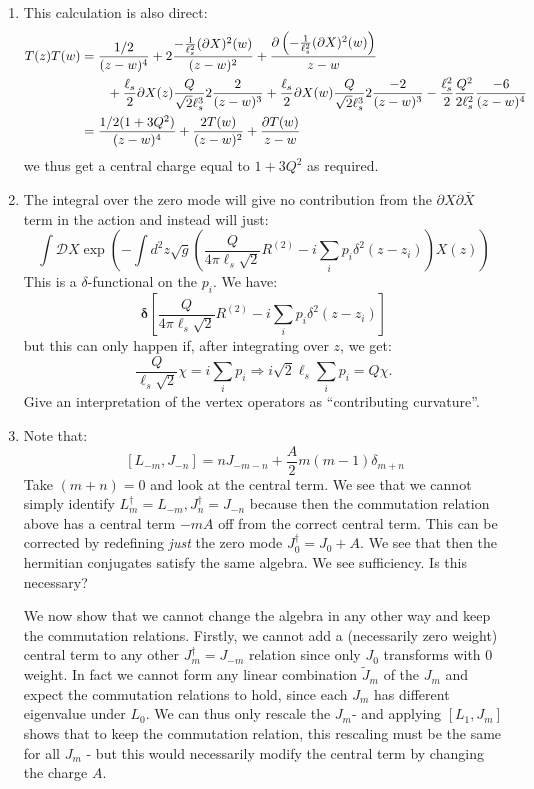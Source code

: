 \documentclass[11pt]{article}
\begin{document}
\begin{enumerate}
	
	\item This calculation is also direct:
	\[
	\begin{aligned}
		T(z) T(w) &= \frac{1/2}{(z-w)^4} + 2\frac{-\frac{1}{\ell_s^2} (\partial X)^2(w)}{(z-w)^2} + \frac{\partial \left(-\frac{1}{\ell_s^2} (\partial X)^2(w)\right)}{z-w} \\
		& \qquad + \frac{\ell_s}{2} \partial X(z) \frac{Q}{\sqrt2 \ell_s^3} 2\frac{2}{(z-w)^3} + \frac{\ell_s}{2} \partial X(w) \frac{Q}{\sqrt2 \ell_s^3} 2\frac{-2}{(z-w)^3} -\frac{\ell_s^2}{2} \frac{Q^2}{2\ell_s^2} \frac{-6}{(z-w)^4}\\
		&= \frac{1/2 (1 + 3 Q^2)}{(z-w)^4} + \frac{2 T(w)}{(z-w)^2} + \frac{\partial T(w)}{z-w}
	\end{aligned}
	\]
	we thus get a central charge equal to $1 + 3 Q^2$ as required. 
	
	\item The integral over the zero mode will give no contribution from the $\partial X \partial \bar X$ term in the action and instead will just:
	\[
		\int \mathcal D X \exp\left(- \int d^2 z \sqrt{g} \left(\frac{ Q}{4 \pi \ell_s \sqrt{2} } R^{(2)} - i \sum_{i} p_i \delta^2(z-z_i) \right) X(z) \right)
	\]
	This is a $\delta$-functional on the $p_i$. We have:
	\[
		\boldsymbol{\delta}\left[ \frac{Q}{4 \pi \ell_s \sqrt{2} } R^{(2)} - i \sum_{i} p_i \delta^2(z-z_i) \right]
	\]
	but this can only happen if, after integrating over $z$, we get:
	\[
		\frac{Q}{\ell_s \sqrt 2} \chi = i \sum_i p_i \Rightarrow i \sqrt{2} \ell_s \sum_i p_i = Q \chi.
	\]
	Give an interpretation of the vertex operators as ``contributing curvature''.
	
	\item Note that:
	\[
		\, [L_{-m}, J_{-n}] = n J_{-m - n} + \frac{A}{2} m (m-1) \delta_{m+n} %
	\]
	Take $(m+n)=0$ and look at the central term. We see that we cannot simply identify $L^{\dagger}_{m} = L_{-m}, J^\dagger_{n} = J_{-n}$ because then the commutation relation above has a central term  $-m A$ off from the correct central term. This can be corrected by redefining \emph{just} the zero mode  $J^\dagger_0 = J_0 + A$. We see that then the hermitian conjugates satisfy the same algebra. We see sufficiency. Is this necessary? 
	
	We now show that we cannot change the algebra in any other way and keep the commutation relations. Firstly, we cannot add a (necessarily zero weight) central term to any other $J_m^\dagger = J_{-m}$ relation since only $J_0$ transforms with $0$ weight. In fact we cannot form any linear combination $\tilde J_m$ of the $J_m$ and expect the commutation relations to hold, since each $J_m$ has different eigenvalue under $L_0$. We can thus only rescale the $J_m$- and applying $[L_1, J_m]$ shows that to keep the commutation relation, this rescaling must be the same for all $J_m$ - but this would necessarily modify the central term by changing the charge $A$. 


\end{enumerate}
\end{document}
